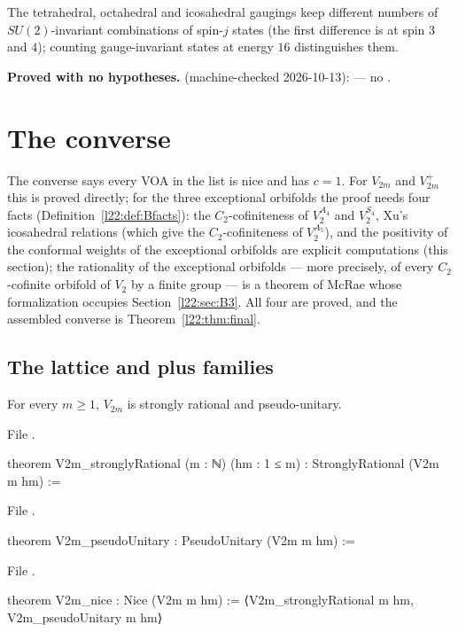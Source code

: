 \begin{physics}
The tetrahedral, octahedral and icosahedral gaugings keep different numbers of $SU(2)$-invariant combinations of
spin-$j$ states (the first difference is at spin $3$ and $4$); counting gauge-invariant states at energy $16$
distinguishes them.
\end{physics}

\begin{status}
\textbf{Proved with no hypotheses.}  (machine-checked 2026-10-13):
 --- no .
\end{status}

\section{The converse}\label{l22:sec:converse}

The converse says every VOA in the list is nice and has $c=1$. For $V_{2m}$ and $V_{2m}^+$ this is proved directly; for
the three exceptional orbifolds the proof needs four facts (Definition~\ref{l22:def:Bfacts}): the
$C_2$-cofiniteness of $V_2^{A_4}$ and $V_2^{S_4}$, Xu's icosahedral relations (which give the $C_2$-cofiniteness of
$V_2^{A_5}$), and the positivity of the conformal weights of the exceptional orbifolds are explicit computations
(this section); the rationality of the exceptional orbifolds --- more precisely, of every $C_2$-cofinite orbifold of
$V_2$ by a finite group --- is a theorem of McRae whose formalization occupies Section~\ref{l22:sec:B3}. All four are proved, and the assembled converse is
Theorem~\ref{l22:thm:final}.

\subsection{The lattice and plus families}

\begin{theorem}[$V_{2m}$ is nice]\label{l22:thm:V2mnice}
For every $m\ge1$, $V_{2m}$ is strongly rational and pseudo-unitary.
\end{theorem}
\noindent File .
\begin{leancode}
theorem V2m_stronglyRational (m : ℕ) (hm : 1 ≤ m) : StronglyRational (V2m m hm) :=
\end{leancode}
\noindent File .
\begin{leancode}
theorem V2m_pseudoUnitary : PseudoUnitary (V2m m hm) :=
\end{leancode}
\noindent File .
\begin{leancode}
theorem V2m_nice : Nice (V2m m hm) := ⟨V2m_stronglyRational m hm, V2m_pseudoUnitary m hm⟩
\end{leancode}

